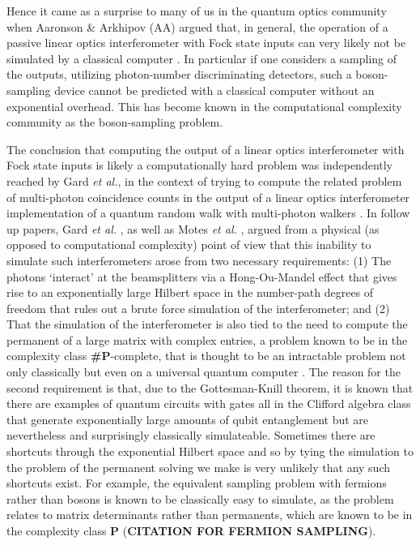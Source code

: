 \documentclass[aps,pra,twocolumn,amsmath,amssymb,nofootinbib,superscriptaddress]{revtex4}
\begin{document}
Hence it came as a surprise to many of us in the quantum optics community when Aaronson \& Arkhipov (AA) argued that, in general, the operation of a passive linear optics interferometer with Fock state inputs can very likely not be simulated by a classical computer \cite{aar}. In particular if one considers a sampling of the outputs, utilizing photon-number discriminating detectors, such a boson-sampling device cannot be predicted with a classical computer without an exponential overhead. This has become known in the computational complexity community as the boson-sampling problem. 

The conclusion that computing the output of a linear optics interferometer with Fock state inputs is likely a computationally hard problem was independently reached by Gard \emph{et al.}, in the context of trying to compute the related problem of multi-photon coincidence counts in the output of a linear optics interferometer implementation of a quantum random walk with multi-photon walkers \cite{gard2}. In follow up papers, Gard \emph{et al.} \cite{gard}, as well as Motes \emph{et al.} \cite{motes}, argued from a physical (as opposed to computational complexity) point of view that this inability to simulate such interferometers arose from two necessary requirements: (1) The photons `interact' at the beamsplitters via a Hong-Ou-Mandel effect that gives rise to an exponentially large Hilbert space in the number-path degrees of freedom that rules out a brute force simulation of the interferometer; and (2) That the simulation of the interferometer is also tied to the need to compute the permanent of a large matrix with complex entries, a problem known to be in the complexity class \textbf{\#P}-complete, that is thought to be an intractable problem not only classically but even on a universal quantum computer \cite{bib:Ryser63}. The reason for the second requirement is that, due to the Gottesman-Knill theorem, it is known that there are examples of quantum circuits with gates all in the Clifford algebra class that generate exponentially large amounts of qubit entanglement but are nevertheless and surprisingly classically simulateable. Sometimes there are shortcuts through the exponential Hilbert space and so by tying the simulation to the problem of the permanent solving we make is very unlikely that any such shortcuts exist. For example, the equivalent sampling problem with fermions rather than bosons is known to be classically easy to simulate, as the problem relates to matrix determinants rather than permanents, which are known to be in the complexity class \textbf{P} (\textbf{CITATION FOR FERMION SAMPLING}).
\end{document}
